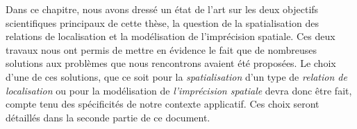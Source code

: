 Dans ce chapitre, nous avons dressé un état de l'art sur les deux
objectifs scientifiques principaux de cette thèse, la question de la
spatialisation des relations de localisation et la modélisation de
l'imprécision spatiale. Ces deux travaux nous ont permis de mettre en
évidence le fait que de nombreuses solutions aux problèmes que nous
rencontrons avaient été proposées. Le choix d'une de ces solutions,
que ce soit pour la \emph{spatialisation} d'un type de \emph{relation
  de localisation} ou pour la modélisation de \emph{l'imprécision
  spatiale} devra donc être fait, compte tenu des spécificités de
notre contexte applicatif. Ces choix seront détaillés dans la seconde
partie de ce document.


